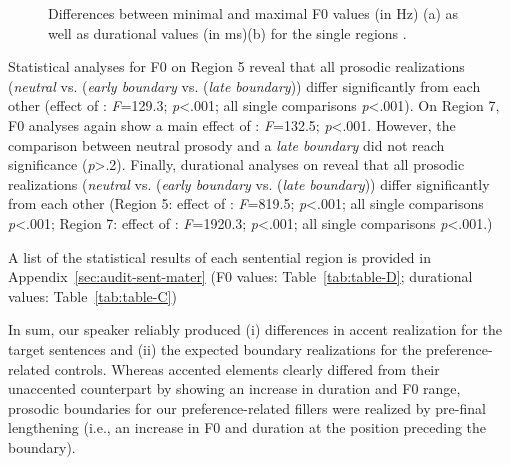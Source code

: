 \documentclass[fleqn,reqno,10pt,draft]{article}
\begin{document}
\begin{figure}[t]
{
	    \label{fig:duration_fi}
	}
	\caption[]{Differences between minimal and maximal F0 values (in Hz) (a) as well
	as durational values (in ms)(b) for 
	the single regions  .}
	\label{fig:acoustics_fi}
\end{figure}


Statistical analyses for F0 on Region 5 reveal that all prosodic
realizations (\emph{neutral} vs. (\emph{early boundary}
vs. (\emph{late boundary})) differ significantly from each other
(effect of : \emph{F}=129.3; \emph{p}<.001; all single
comparisons \emph{p}<.001). On Region 7, F0 analyses again show a main
effect of : \emph{F}=132.5; \emph{p}<.001. However, the
comparison between neutral prosody and a \emph{late boundary} did not
reach significance (\emph{p}>.2). Finally, durational analyses on
reveal that all prosodic realizations (\emph{neutral} vs. (\emph{early
  boundary} vs. (\emph{late boundary})) differ significantly from each
other (Region 5: effect of : \emph{F}=819.5;
\emph{p}<.001; all single comparisons \emph{p}<.001; Region 7: effect
of : \emph{F}=1920.3; \emph{p}<.001; all single
comparisons \emph{p}<.001.)

A list of the statistical results of each sentential region is
provided in Appendix~\ref{sec:audit-sent-mater} (F0 values:
Table~\ref{tab:table-D}; durational values: Table~\ref{tab:table-C})

In sum, our speaker reliably
produced (i) differences in accent realization for the target
sentences and (ii) the expected boundary realizations for the
preference-related controls. Whereas accented elements clearly
differed from their unaccented counterpart by showing an increase in
duration and F0 range, prosodic boundaries for our preference-related
fillers were realized by pre-final lengthening (i.e., an increase in F0
and duration at the position preceding the boundary).
\end{document}
